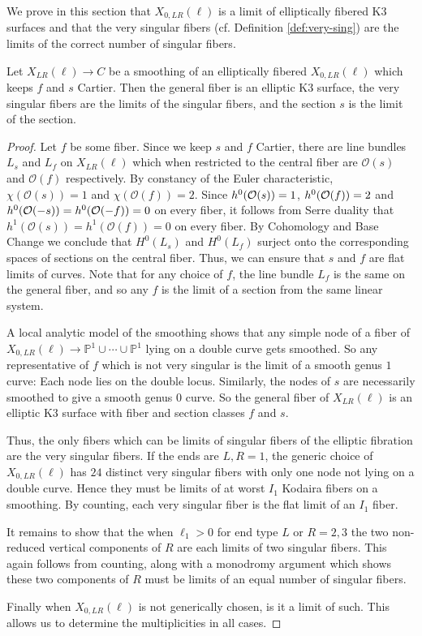 \documentclass[table,x11names]{amsart}
\begin{document}
We prove in this section that $X_{0,LR}(\ell)$ is a limit of elliptically fibered
K3 surfaces and that the very singular fibers (cf. Definition \ref{def:very-sing}) are the limits
of the correct number of singular fibers. 

\begin{proposition}\label{limit} Let $X_{LR}(\ell)\rightarrow C$
be a smoothing of an
elliptically fibered $X_{0,LR}(\ell)$ which keeps $f$
and $s$ Cartier. Then the general fiber is an elliptic K3 surface,
the very singular fibers are the limits of the singular fibers,
and the section $s$ is the limit of the section. \end{proposition}

\begin{proof} Let $f$ be some fiber.
Since we keep $s$ and $f$ Cartier, there are line bundles $L_s$ and $L_f$ on
$X_{LR}(\ell)$ which when restricted to the central
fiber are $\mathcal{O}(s)$ and $\mathcal{O}(f)$ respectively.
By constancy of the Euler characteristic, $\chi(\mathcal{O}(s))=1$ and
$\chi(\mathcal{O}(f))= 2$. 
Since 
$h^0({\mathcal O}(s))=1$, $h^0({\mathcal O}(f))=2$ and
$h^0({\mathcal O}(-s))=h^0({\mathcal O}(-f))=0$
on every fiber,
it follows from Serre duality that
$h^1(\mathcal{O}(s))=h^1(\mathcal{O}(f))=0$ on every fiber.
By Cohomology and Base Change
\cite[III.12.11]{hartshorne1977algebraic-geometry} we conclude that 
$H^0(L_s)$ and $H^0(L_f)$ surject onto the corresponding
spaces of sections on the central fiber. Thus, we can ensure that $s$ and
$f$ are flat limits of curves.
Note that for any choice of $f$, the line bundle $L_f$ is the
same on the general fiber, and so any $f$ is the limit of a section
from the same linear system.

A local analytic model of the smoothing shows that
any simple node of a fiber of
$X_{0,LR}(\ell)\rightarrow \mathbb{P}^1\cup\cdots\cup\mathbb{P}^1$
lying on a double curve gets smoothed. So any representative of
 $f$ which is not very singular is the limit of a smooth genus $1$
curve: Each node lies on the double locus.
Similarly, the nodes of $s$ are 
necessarily smoothed to give a smooth genus $0$ curve.
So the general fiber of $X_{LR}(\ell)$ is an elliptic K3 surface with
fiber and section classes $f$ and $s$.

Thus,
the only fibers which can be limits of singular fibers of the elliptic fibration
are the very singular fibers. If the ends are $L,R=1$, the generic choice
of $X_{0,LR}(\ell)$ has $24$ distinct very singular fibers with only one
node not lying on a double curve. Hence they must be limits of at worst $I_1$
Kodaira fibers on a smoothing. By counting,
each very singular fiber is the flat limit of an $I_1$ fiber.

It remains to show that the when $\ell_1>0$ for end type $L$ or $R=2,3$
the two non-reduced vertical components of $R$ are each limits of two singular fibers.
This again follows from counting, 
along with a monodromy argument which shows these two components
of $R$ must be limits of an equal number of singular fibers.

Finally when $X_{0,LR}(\ell)$ is not generically chosen,
is it a limit of such. This allows us to determine the
multiplicities in all cases. \end{proof}
\end{document}

